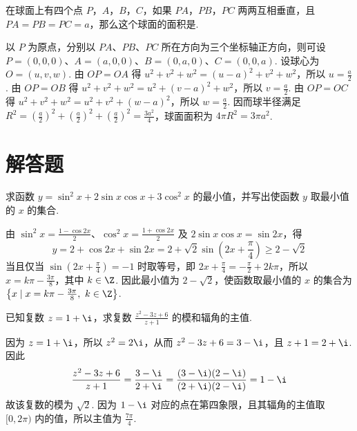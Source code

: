 \begin{problem}
在球面上有四个点 \(P\)，\(A\)，\(B\)，\(C\)，如果 \(PA\)，\(PB\)，\(PC\) 两两互相垂直，且 \(PA=PB=PC=a\)，那么这个球面的面积是\fillinblank{}.


\begin{solution}
以 \(P\) 为原点，分别以 \(PA\)、\(PB\)、\(PC\) 所在方向为三个坐标轴正方向，则可设 \(P=(0,0,0)\)、\(A=(a,0,0)\)、\(B=(0,a,0)\)、\(C=(0,0,a)\). 设球心为 \(O=(u,v,w)\). 由 \(OP=OA\) 得 \(u^2+v^2+w^2=(u-a)^2+v^2+w^2\)，所以 \(u=\frac a2\). 由 \(OP=OB\) 得 \(u^2+v^2+w^2=u^2+(v-a)^2+w^2\)，所以 \(v=\frac a2\). 由 \(OP=OC\) 得 \(u^2+v^2+w^2=u^2+v^2+(w-a)^2\)，所以 \(w=\frac a2\). 因而球半径满足 \(R^2=\left(\frac a2\right)^2+\left(\frac a2\right)^2+\left(\frac a2\right)^2=\frac{3a^2}{4}\)，球面面积为 \(4\pi R^2=3\pi a^2\).
\end{solution}
\end{problem}

\section{解答题}

\begin{problem}
求函数 \(y=\sin^2 x+2\sin x\cos x+3\cos^2 x\) 的最小值，并写出使函数 \(y\) 取最小值的 \(x\) 的集合.

\begin{solution}
由 \(\sin^2x=\frac{1-\cos2x}{2}\)、\(\cos^2x=\frac{1+\cos2x}{2}\) 及 \(2\sin x\cos x=\sin2x\)，得
\[
y=2+\cos2x+\sin2x=2+\sqrt2\sin\left(2x+\frac{\pi}{4}\right)\geq 2-\sqrt2
\]
当且仅当 \(\sin\left(2x+\frac{\pi}{4}\right)=-1\) 时取等号，即 \(2x+\frac{\pi}{4}=-\frac{\pi}{2}+2k\pi\)，所以 \(x=k\pi-\frac{3\pi}{8}\)，其中 \(k\in\Z\). 因此最小值为 \(2-\sqrt2\)，使函数取最小值的 \(x\) 的集合为 \(\left\{x\mid x=k\pi-\frac{3\pi}{8},\ k\in\Z\right\}\).
\end{solution}
\end{problem}

\begin{problem}
已知复数 \(z=1+\i\)，求复数 \(\frac{z^2-3z+6}{z+1}\) 的模和辐角的主值.

\begin{solution}
因为 \(z=1+\i\)，所以 \(z^2=2\i\)，从而 \(z^2-3z+6=3-\i\)，且 \(z+1=2+\i\). 因此
\[
\frac{z^2-3z+6}{z+1}=\frac{3-\i}{2+\i}=\frac{(3-\i)(2-\i)}{(2+\i)(2-\i)}=1-\i
\]
故该复数的模为 \(\sqrt2\). 因为 \(1-\i\) 对应的点在第四象限，且其辐角的主值取 \([0,2\pi)\) 内的值，所以主值为 \(\frac{7\pi}{4}\).
\end{solution}
\end{problem}

